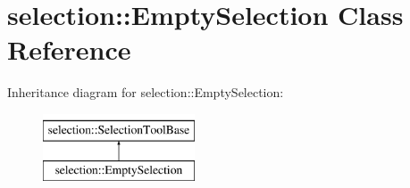 \hypertarget{classselection_1_1EmptySelection}{}\section{selection\+:\+:Empty\+Selection Class Reference}
\label{classselection_1_1EmptySelection}
Inheritance diagram for selection\+:\+:Empty\+Selection\+:\begin{figure}[H]
\begin{center}
\leavevmode
\includegraphics[height=2.000000cm]{classselection_1_1EmptySelection}
\end{center}
\end{figure}
